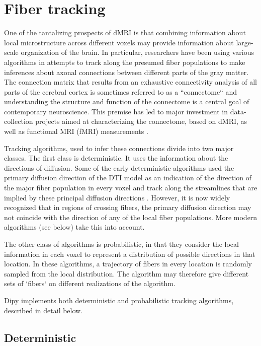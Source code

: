 \documentclass{bioinfo}
\begin{document}
\section{Fiber tracking}\label{fiber_tracking}
One of the tantalizing prospects of dMRI is that combining
information about local microstructure across different voxels may provide
information about large-scale organization of the brain. In particular,
researchers have been using various algorithms in attempts to track along the
presumed fiber populations to make inferences about axonal connections between
different parts of the gray matter. The connection matrix that results from an
exhaustive connectivity analysis of all parts of the cerebral cortex is
sometimes referred to as a ``connectome`` \cite{sporns2005} and understanding
the structure and function of the connectome is a central goal of contemporary
neuroscience. This premise has led to major investment in data-collection
projects aimed at characterizing the connectome, based on dMRI, as well as
functional MRI (fMRI) measurements \cite{VanEssen2013}.

Tracking algorithms, used to infer these connections divide into two major
classes. The first class is deterministic. It uses the information about the
directions of diffusion. Some of the early deterministic algorithms used the
primary diffusion direction of the DTI model as an indication of the direction
of the major fiber population in every voxel and track along the streamlines
that are implied by these principal diffusion directions \citep{Mori1999,
  conturo-lori-etal:99, basser-pajevic-etal:00} . However, it is
now widely recognized that in regions of crossing fibers, the primary diffusion
direction may not coincide with the direction of any of the local fiber
populations. More modern algorithms (see below) take this into account.

The other class of algorithms is probabilistic, in that they consider the local
information in each voxel to represent a distribution of possible directions in
that location. In these algorithms, a trajectory of fibers in every location is
randomly sampled from the local distribution. The algorithm may therefore give
different sets of `fibers` on different realizations of the algorithm.

Dipy implements both deterministic and probabilistic tracking algorithms,
described in detail below.

\subsection{Deterministic}
\end{document}
